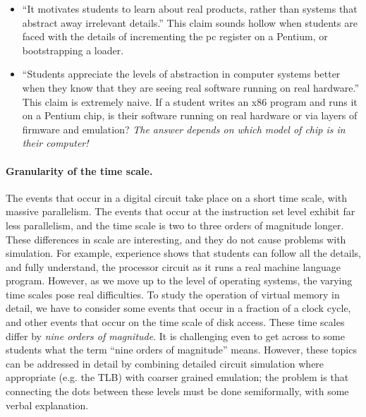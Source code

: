 \documentclass[submission,copyright,creativecommons]{eptcs}
\begin{document}
\begin{itemize}
\item ``It motivates students to learn about real products, rather
  than systems that abstract away irrelevant details.''  This claim
  sounds hollow when students are faced with the details of
  incrementing the pc register on a Pentium, or bootstrapping a
  loader.
\item ``Students appreciate the levels of abstraction in computer
  systems better when they know that they are seeing real software
  running on real hardware.''  This claim is extremely naive.  If a
  student writes an x86 program and runs it on a Pentium chip, is
  their software running on real hardware or via layers of firmware
  and emulation?  \emph{The answer depends on which model of chip
    is in their computer!}
\end{itemize}

\paragraph{Granularity of the time scale.}
The events that occur in a digital circuit take place on a short
time scale, with massive parallelism.  The events that occur at the
instruction set level exhibit far less parallelism, and the time
scale is two to three orders of magnitude longer.  These
differences in scale are interesting, and they do not cause
problems with simulation.  For example, experience shows that
students can follow all the details, and fully understand, the
processor circuit as it runs a real machine language program.
However, as we move up to the level of operating systems, the
varying time scales pose real difficulties.  To study the operation
of virtual memory in detail, we have to consider some events that
occur in a fraction of a clock cycle, and other events that occur
on the time scale of disk access.  These time scales differ by
\emph{nine orders of magnitude}.  It is challenging even to get
across to some students what the term ``nine orders of magnitude''
means.  However, these topics can be addressed in detail by
combining detailed circuit simulation where appropriate (e.g. the
TLB) with coarser grained emulation; the problem is that connecting
the dots between these levels must be done semiformally, with some
verbal explanation.
\end{document}
